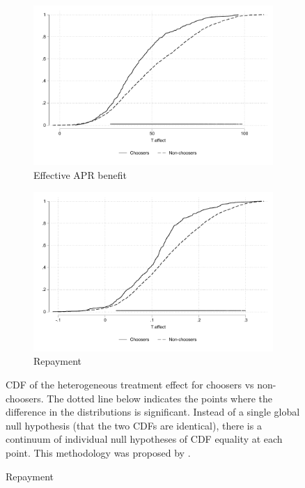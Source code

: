 \documentclass[oneside,11pt]{article}
\begin{document}
    
\begin{figure}[H]
    \caption{Negative selection on treatment effects}
    \label{benefit_vs_choice_cdf}
    \begin{center}
    \begin{subfigure}{0.475\textwidth}
        \caption{Effective APR benefit}
        \centering
        \includegraphics[width=\textwidth]{Figuras/cdf_predchoose_tau_apr.pdf}
    \end{subfigure}
    \begin{subfigure}{0.475\textwidth}
        \caption{Repayment}
        \centering
        \includegraphics[width=\textwidth]{Figuras/cdf_predchoose_tau_des.pdf}
    \end{subfigure}
  
    \end{center}
     \scriptsize    CDF of the heterogeneous treatment effect for choosers vs non-choosers. The dotted line below indicates the points where the difference in the distributions is significant.  Instead of a single global null hypothesis (that the two CDFs are identical), there is a continuum of individual null hypotheses of CDF equality at each point. This methodology was proposed by \cite{GOLDMAN2018143}.
\end{figure}
\end{document}
